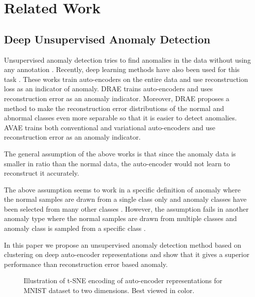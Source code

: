 \documentclass[conference]{IEEEtran}
\begin{document}
\section{Related Work}
\subsection{Deep Unsupervised Anomaly Detection}

Unsupervised anomaly detection tries to find anomalies in the data without using any annotation \cite{ANOM}. 
Recently, deep learning methods have also been used for this task \cite{DRAE, AVAE}. These works train auto-encoders on the entire data and use reconstruction loss as an indicator of anomaly. 
DRAE \cite{DRAE} trains auto-encoders and uses reconstruction error as an anomaly indicator. 
Moreover, DRAE proposes a method to make the reconstruction error distributions of the normal and abnormal classes even more separable so that it is easier to detect anomalies. 
AVAE \cite{AVAE} trains both conventional and variational auto-encoders and use reconstruction error as an anomaly indicator. 

The general assumption of the above works is that since the anomaly data is smaller in ratio than the normal data, the auto-encoder would not learn to reconstruct it accurately. 

The above assumption seems to work in a specific definition of anomaly where the normal samples are drawn from a single class only and anomaly classes have been selected from many other classes \cite{DRAE}.
However, the assumption fails in another anomaly type where the normal samples are drawn from multiple classes and anomaly class is sampled from a specific class \cite{AVAE}.

In this paper we propose an unsupervised anomaly detection method based on clustering on deep auto-encoder representations and show that it gives a superior performance than reconstruction error based anomaly.


\begin{figure*}

\centering
  
\caption{Illustration of t-SNE encoding of auto-encoder representations for MNIST dataset to two dimensions. Best viewed in color.} \label{fig:1}
\end{figure*}
\end{document}
